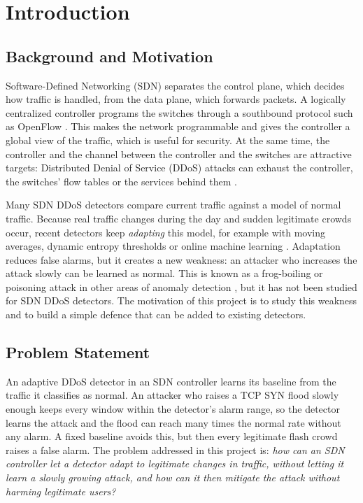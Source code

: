 \documentclass[12pt,a4paper,oneside]{report}
\begin{document}
\chapter{Introduction}
\section{Background and Motivation}
Software-Defined Networking (SDN) separates the control plane, which decides how traffic is handled, from the data plane, which forwards packets. A logically centralized controller programs the switches through a southbound protocol such as OpenFlow \citep{mckeown2008openflow,onf2012of13}. This makes the network programmable and gives the controller a global view of the traffic, which is useful for security. At the same time, the controller and the channel between the controller and the switches are attractive targets: Distributed Denial of Service (DDoS) attacks can exhaust the controller, the switches' flow tables or the services behind them \citep{sinha2025survey,wang_sdn_survey}.

Many SDN DDoS detectors compare current traffic against a model of normal traffic. Because real traffic changes during the day and sudden legitimate crowds occur, recent detectors keep \emph{adapting} this model, for example with moving averages, dynamic entropy thresholds or online machine learning \citep{zhang2026time,tan2011hst}. Adaptation reduces false alarms, but it creates a new weakness: an attacker who increases the attack slowly can be learned as normal. This is known as a frog-boiling or poisoning attack in other areas of anomaly detection \citep{rubinstein2009antidote,chantin2009frog}, but it has not been studied for SDN DDoS detectors. The motivation of this project is to study this weakness and to build a simple defence that can be added to existing detectors.

\section{Problem Statement}
An adaptive DDoS detector in an SDN controller learns its baseline from the traffic it classifies as normal. An attacker who raises a TCP SYN flood slowly enough keeps every window within the detector's alarm range, so the detector learns the attack and the flood can reach many times the normal rate without any alarm. A fixed baseline avoids this, but then every legitimate flash crowd raises a false alarm. The problem addressed in this project is: \emph{how can an SDN controller let a detector adapt to legitimate changes in traffic, without letting it learn a slowly growing attack, and how can it then mitigate the attack without harming legitimate users?}
\end{document}
